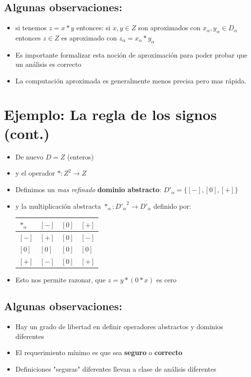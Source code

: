 \documentclass[11pt]{article}
\begin{document}
\subsection*{Algunas observaciones:}
\label{sec:org592f0e8}
\begin{itemize}
\item si tenemos \(z = x * y\) entonces:
si \(x,y \in Z\) son aproximados con \(x_\alpha, y_\alpha \in
    D_\alpha\) entonces \(z \in Z\) es aproximado con \(z_\alpha = x_\alpha * y_\alpha\)
\item Es importante formalizar esta noción de aproximación para poder
probar que un análisis es correcto
\item La computación aproximada es generalmente menos precisa pero mas rápida.
\end{itemize}





\section*{Ejemplo: La regla de los signos (cont.)}
\label{sec:orga40c067}

\begin{itemize}
\item De nuevo \(D = Z\) (enteros)
\item y el operador \(* : Z^2 \to Z\)
\item Definimos un \emph{mas refinado} \textbf{dominio abstracto}: \(D'_\alpha = \{[-],[0],[+]\}\)
\item y la multiplicación abstracta \(*_\alpha : {D'_\alpha}^2 \to D'_\alpha\)
definido por: 
\begin{center}
\begin{tabular}{llll}
\(*_\alpha\) & \([-]\) & \([0]\) & \([+]\)\\
\hline
\([-]\) & \([+]\) & \([0]\) & \([-]\)\\
\([0]\) & \([0]\) & \([0]\) & \([0]\)\\
\([+]\) & \([-]\) & \([0]\) & \([+]\)\\
\hline
\end{tabular}
\end{center}
\item Esto nos permite razonar, que \(z=y*(0*x)\) es cero
\end{itemize}
\subsection*{Algunas observaciones:}
\label{sec:org28fc0e5}
\begin{itemize}
\item Hay un grado de libertad en definir operadores abstractos y
dominios diferentes
\item El requerimiento mínimo es que sea \textbf{seguro} o \textbf{correcto}
\item Definiciones "seguras" diferentes llevan a clase de análisis diferentes
\end{itemize}
\end{document}
